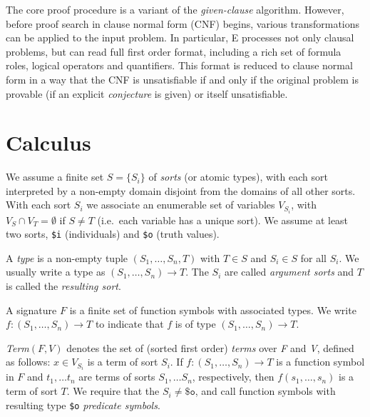\documentclass{report}
\begin{document}
The core proof procedure is a variant of the \emph{given-clause}
algorithm. However, before proof search in clause normal form (CNF)
begins, various transformations can be applied to the input
problem. In particular, E processes not only clausal problems, but can
read full first order format, including a rich set of formula roles,
logical operators and quantifiers. This format is reduced to clause
normal form in a way that the CNF is unsatisfiable if and only if the
original problem is provable (if an explicit \emph{conjecture} is
given) or itself unsatisfiable.


\section{Calculus}

We assume a finite set $S=\{S_i\}$ of \emph{sorts}
(or atomic types), with each sort interpreted by a non-empty domain
disjoint from the domains of all other sorts. With each sort $S_i$ we
associate an enumerable set of variables $V_{S_i}$, with
$V_S\cap V_T = \emptyset$ if $S\not=T$ (i.e.\ each variable has a
unique sort). We assume at least two sorts, \texttt{\$i} (individuals)
and \texttt{\$o} (truth values).

A \emph{type} is a non-empty tuple $(S_1, \ldots, S_n, T)$
with $T\in S$ and $S_i \in S$ for all $S_i$. We usually write a type
as $(S_1, \ldots, S_n) \to T$. The $S_i$ are called \emph{argument
  sorts} and $T$ is called the \emph{resulting sort}.

A signature $F$ is a finite set of function symbols with associated
types. We write $f:(S_1, \ldots, S_n)
 \to T$ to indicate that $f$ is
of type $(S_1, \ldots, S_n) \to T$.

\emph{Term}$(F,V)$ denotes the set of (sorted first order)
\emph{terms} over \emph{F} and \emph{V}, defined as follows:
$x \in V_{S_i}$ is a term of sort $S_i$. If
$f:(S_1, \ldots, S_n) \to T$ is a function symbol in $F$ and
$t_1, \ldots t_n$ are terms of sorts $S_1, \ldots S_n$, respectively,
then $f(s_1, \ldots, s_n)$ is a term of sort $T$. We require that the
$S_i\not=\mathtt{\$o}$, and call function symbols with resulting type
\texttt{\$o} \emph{predicate symbols}.
\end{document}
